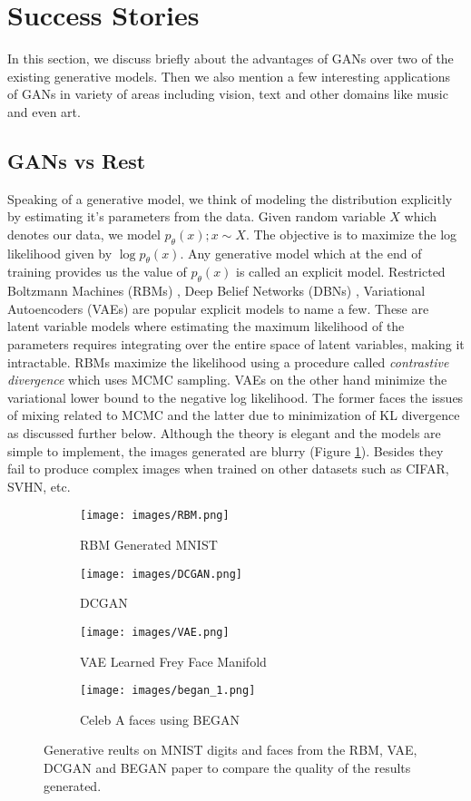 \section{Success Stories}
\label{sec:success}
In this section, we discuss briefly about the advantages of GANs over two of the existing generative models. Then we also mention a few interesting applications of GANs in variety of areas including vision, text and other domains like music and even art.
\subsection{GANs vs Rest}
Speaking of a generative model, we think of modeling the distribution explicitly by estimating it's parameters from the data. Given random variable $X$ which denotes our data, we model $p_{\theta}(x); x\sim X$. The objective is to maximize the log likelihood given by $\log p_{\theta}(x)$. Any generative model which at the end of training provides us the value of $p_{\theta}(x)$ is called an explicit model.
Restricted Boltzmann Machines (RBMs) \citep{hinton2006} , Deep Belief Networks (DBNs) \citep{dbn}, Variational Autoencoders (VAEs) \citep{kingma2014} are popular explicit models to name a few. These are latent variable models where estimating the maximum likelihood of the parameters requires integrating over the entire space of latent variables, making it intractable. RBMs maximize the likelihood using a procedure called \textit{contrastive divergence} which uses MCMC sampling. VAEs on the other hand minimize the variational lower bound to the negative log likelihood. The former faces the issues of mixing related to MCMC and the latter due to minimization of KL divergence as discussed further below. Although the theory is elegant and the models are simple to implement, the images generated are blurry (Figure \ref{fig:1}).  Besides they fail to produce complex images when trained on other datasets such as CIFAR, SVHN, etc.


\begin{figure}[!ht]
\begin{subfigure}{.2\textwidth}
\centering
\texttt{[image: images/RBM.png]}
\caption{RBM Generated MNIST}
\end{subfigure}
\begin{subfigure}{.25\textwidth}
\centering
\texttt{[image: images/DCGAN.png]}
\caption{DCGAN}
\end{subfigure}
\begin{subfigure}{.25\textwidth}
\centering
\texttt{[image: images/VAE.png]}
\caption{VAE Learned Frey Face Manifold}
\end{subfigure}
\begin{subfigure}{.25\textwidth}
\centering
\texttt{[image: images/began\_1.png]}
\caption{Celeb A faces using BEGAN}
\end{subfigure}
\caption{Generative reults on MNIST digits and faces from the RBM, VAE, DCGAN and BEGAN paper to compare the quality of the results generated.}
\label{fig:1}
\end{figure}


